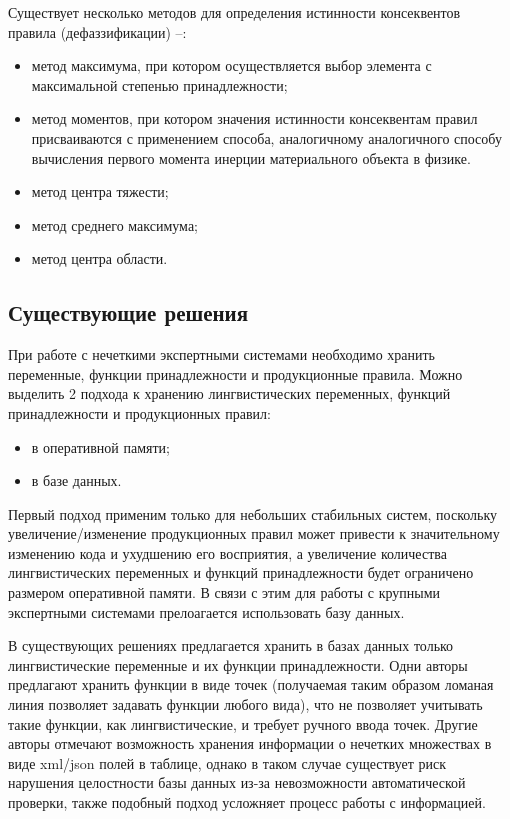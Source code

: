 Существует несколько методов для определения истинности консеквентов правила (дефаззификации) \cite{FuzRegul}--\cite{ExpSystems}:
\begin{itemize}
	\item метод максимума, при котором осуществляется выбор элемента с максимальной степенью принадлежности;
	\item метод моментов, при котором значения истинности консеквентам правил присваиваются с применением способа, аналогичному аналогичного способу вычисления первого момента инерции материального объекта в физике.
	\item метод центра тяжести;
	\item метод среднего максимума;
	\item метод центра области.
\end{itemize}

\subsection{Существующие решения}
При работе с нечеткими экспертными системами необходимо хранить переменные, функции принадлежности и продукционные правила. Можно выделить 2 подхода к хранению лингвистических переменных, функций принадлежности и продукционных правил:
\begin{itemize}
	\item в оперативной памяти;
	\item в базе данных.
\end{itemize}

Первый подход применим только для небольших стабильных систем, поскольку увеличение/изменение продукционных правил может привести к значительному изменению кода и ухудшению его восприятия, а увеличение количества лингвистических переменных и функций принадлежности будет ограничено размером оперативной памяти.
В связи с этим для работы с крупными экспертными системами прелоагается использовать базу данных.

В существующих решениях предлагается хранить в базах данных только лингвистические переменные и их функции принадлежности. Одни авторы \cite{Sorokin} предлагают хранить функции в виде точек (получаемая таким образом ломаная линия позволяет задавать функции любого вида), что не позволяет учитывать такие функции, как лингвистические, и требует ручного ввода точек. Другие авторы \cite{Mongo} отмечают возможность хранения информации о нечетких множествах в виде xml/json полей в таблице, однако в таком случае существует риск нарушения целостности базы данных из-за невозможности автоматической проверки, также подобный подход усложняет процесс работы с информацией. 

